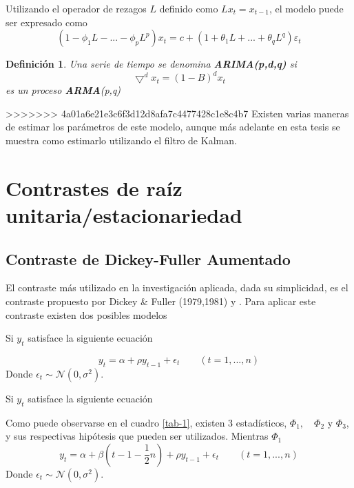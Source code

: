 \documentclass[12pt, twoside]{book}\usepackage[]{graphicx}\usepackage[]{color}
\numberwithin{equation}{section}
\numberwithin{theorem}{section}
\numberwithin{teorema}{section}
\newtheorem{defi}{Definición}
\newenvironment{defin}
      {\begin{shaded}\begin{defi}}
      {\end{defi}\end{shaded}}
\numberwithin{defi}{section}
\numberwithin{prop}{section}
\numberwithin{defi}{section}
\theoremstyle{plain}
\begin{document}
Utilizando el operador de rezagos $L$ definido como $Lx_{t}=x_{t-1}$, el modelo puede ser expresado como 
\begin{equation}
(1-\phi_{1}L-...-\phi_{p}L^{p})x_{t} = c+(1+\theta_{1}L+...+\theta_{q}L^{q})\varepsilon_{t}
\end{equation}

\begin{defin}
Una serie de tiempo se denomina \textbf{ARIMA(p,d,q)} si 
\begin{equation}
\bigtriangledown^{d}x_{t} = (1-B)^{d}x_{t} 
\end{equation}
es un proceso \textbf{ARMA}(p,q)
\end{defin}

>>>>>>> 4a01a6e21e3c6f3d12d8afa7c4477428c1e8c4b7
Existen varias maneras de estimar los parámetros de este modelo, aunque más adelante en esta tesis se muestra como estimarlo utilizando el filtro de Kalman.

\section{Contrastes de raíz unitaria/estacionariedad}

\subsection{Contraste de Dickey-Fuller Aumentado}

El contraste más utilizado en la investigación aplicada, dada su simplicidad, es el contraste propuesto por Dickey \& Fuller (1979,1981) y . Para aplicar este contraste existen dos posibles modelos 

Si $y_{t}$ satisface la siguiente ecuación

\begin{equation}
y_{t} = \alpha+\rho y_{t-1}+\epsilon_{t}\qquad (t=1,...,n)
\end{equation}
Donde $\epsilon_{t}\sim \mathcal{N}(0,\sigma^{2})$. 

Si $y_{t}$ satisface la siguiente ecuación 

Como puede observarse en el cuadro \ref{tab-1}, existen 3 estadísticos, $\Phi_{1},\quad \Phi_{2}$ y $\Phi_{3}$, y sus respectivas hipótesis que pueden ser utilizados. Mientras $\Phi_{1}$
\begin{equation}
y_{t} = \alpha+\beta\left(t-1-\frac{1}{2}n\right)+\rho y_{t-1}+\epsilon_{t}\qquad (t=1,...,n)
\end{equation}
Donde $\epsilon_{t}\sim \mathcal{N}(0,\sigma^{2})$. 
\end{document}
